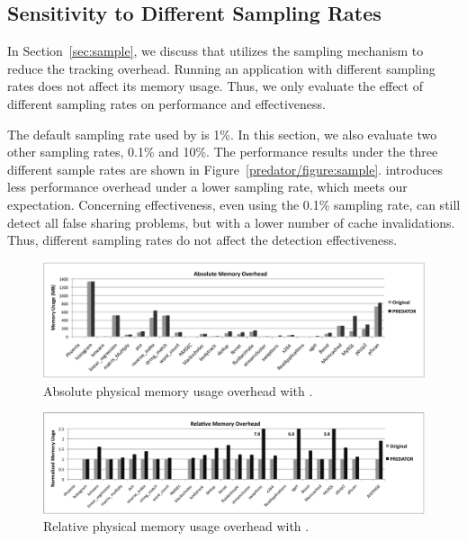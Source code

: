 \subsection{Sensitivity to Different Sampling Rates}
\label{sec:predatorsensitivity}
In Section~\ref{sec:sample}, we discuss that \Predator{} utilizes the sampling mechanism to reduce the tracking overhead. Running an application with different sampling rates does not affect its memory usage. Thus, we only evaluate the effect of different sampling rates on performance and effectiveness. 

The default sampling rate used by \Predator{} is 1\%. In this section, we also evaluate two other sampling rates, 0.1\% and 10\%. The performance results under the three different sample rates are shown in Figure~\ref{predator/figure:sample}. \Predator{} introduces less performance overhead under a lower sampling rate, which meets our expectation. Concerning effectiveness, even using the 0.1\% sampling rate, \Predator{} can still detect all false sharing problems, but with a lower number of cache invalidations. Thus, different sampling rates do not affect the detection effectiveness.
 
\begin{figure}[!t]
\centering
\includegraphics[width=6in]{predator/figure/absolutememory}
\caption{Absolute physical memory usage overhead with \Predator{}.}
\label{fig:absolutememusage}
\end{figure}

\begin{figure}[!t]
\centering
\includegraphics[width=6in]{predator/figure/memusage}
\caption{Relative physical memory usage overhead with \Predator{}.}
\label{fig:memusage}
\end{figure}

